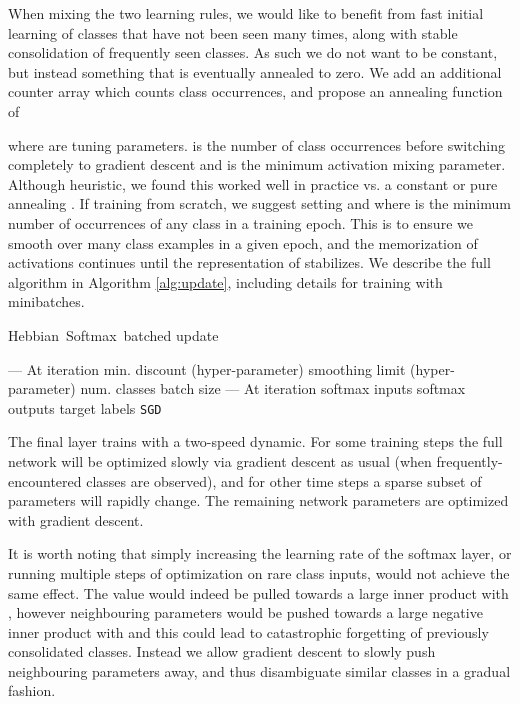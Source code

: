 \documentclass{article} \usepackage{hyperref}
\newcommand{\model}{\hbox{Hebbian Softmax }}
\begin{document}
When mixing the two learning rules, we would like to benefit from fast initial learning of classes that have not been seen many times, along with stable consolidation of frequently seen classes. As such we do not want  to be constant, but instead something that is eventually annealed to zero. We add an additional counter array  which counts class occurrences, and propose an annealing function of

where  are tuning parameters.  is the number of class occurrences before switching completely to gradient descent and  is the minimum activation mixing parameter. Although heuristic, we found this worked well in practice vs. a constant  or pure annealing . If training from scratch, we suggest setting  and  where  is the minimum number of occurrences of any class in a training epoch. This is to ensure we smooth over many class examples in a given epoch, and the memorization of activations continues until the representation of  stabilizes. We describe the full algorithm in Algorithm \ref{alg:update}, including details for training with minibatches.
\begin{algorithm}[tb]
   \caption{\model batched update}
   \label{alg:update}
\begin{algorithmic}
   \STATE --- At iteration 
   \STATE  min. discount (hyper-parameter)
   \STATE  smoothing limit (hyper-parameter)
   \STATE  num. classes
   \STATE  batch size
   \STATE 
   \STATE --- At iteration 
    \STATE  softmax inputs
    \STATE  softmax outputs
    \STATE  target labels
    \STATE \texttt{SGD}
    \FOR{}
        \STATE  
        \IF{}
            \STATE 
            \STATE 
            \STATE 
        \ELSE
            \STATE 
        \ENDIF
        \STATE 
    \ENDFOR

\end{algorithmic}
\end{algorithm}


The final layer trains with a two-speed dynamic. For some training steps the full network will be optimized slowly via gradient descent as usual (when frequently-encountered classes are observed), and for other time steps a sparse subset of parameters will rapidly change. The remaining network parameters are optimized with gradient descent.

It is worth noting that simply increasing the learning rate of the softmax layer, or running multiple steps of optimization on rare class inputs, would not achieve the same effect. The value  would indeed be pulled towards a large inner product with , however neighbouring parameters  would be pushed towards a large negative inner product with  and this could lead to catastrophic forgetting of previously consolidated classes. Instead we allow gradient descent to slowly push neighbouring parameters away, and thus disambiguate similar classes in a gradual fashion.
\end{document}
